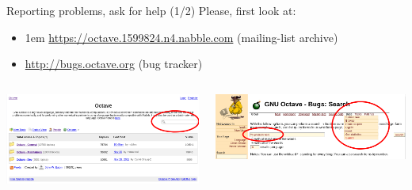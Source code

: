 \begin{frame}{Reporting problems, ask for help (1/2)}
Please, first look at:
\bigskip
\begin{itemize}
\item
\itemsep1em
{\color{DarkBlue}\url{https://octave.1599824.n4.nabble.com}}
(mailing-list archive)
\item
{\color{DarkBlue}\url{http://bugs.octave.org}} (bug tracker)
\end{itemize}
\bigskip\bigskip
\begin{columns}
\begin{column}{0.4\textwidth}
\includegraphics[width=\textwidth]{res/images/nabble_mailing_list_search}
\end{column}
\begin{column}{0.6\textwidth}
\includegraphics[width=\textwidth]{res/images/savannah_bug_search}
\end{column}
\end{columns}
\end{frame}



